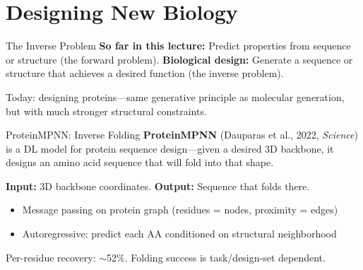 \documentclass[aspectratio=169,10pt]{beamer}
\begin{document}
\section{Designing New Biology}

\begin{frame}{The Inverse Problem}
\textbf{So far in this lecture:} Predict properties from sequence or structure (the forward problem). \textbf{Biological design:} Generate a sequence or structure that achieves a desired function (the inverse problem).
\begin{center}
\end{center}
{\small Today: designing proteins---same generative principle as molecular generation, but with much stronger structural constraints.}
\end{frame}

\begin{frame}{ProteinMPNN: Inverse Folding}
\textbf{ProteinMPNN} (Dauparas et al., 2022, \textit{Science}) is a DL model for protein sequence design---given a desired 3D backbone, it designs an amino acid sequence that will fold into that shape.

\vspace{0.2em}
\textbf{Input:} 3D backbone coordinates. \textbf{Output:} Sequence that folds there.
\begin{itemize}
    \item Message passing on protein graph (residues = nodes, proximity = edges)
    \item Autoregressive: predict each AA conditioned on structural neighborhood
\end{itemize}
\vspace{0.1em}
{\small Per-residue recovery: $\sim$52\%. Folding success is task/design-set dependent.}
\end{frame}
\end{document}
